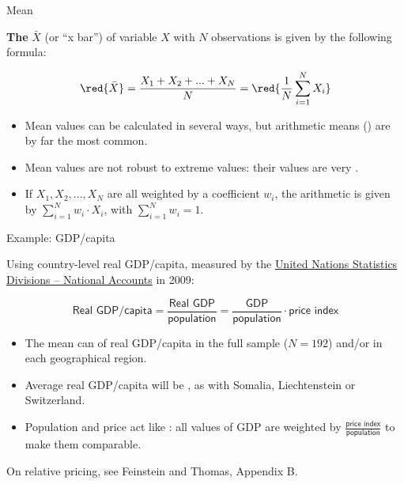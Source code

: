 \documentclass{beamer}
\begin{document}
	\begin{frame}[t]{Mean}

	\textbf{The } $\bar X$ (or ``x bar'') of variable $X$ with $N$ observations is given by the following formula:
	
	$$\red{\bar{X}} = \frac{\displaystyle X_1+X_2+...+X_N}{\displaystyle N} = \red{\frac{1}{N}\sum_{i=1}^N X_i}$$

	\begin{itemize}
		\item Mean values can be calculated in several ways, but arithmetic means () are by far the most common.
		
		\item Mean values are not robust to extreme values: their values are very .
				
		\item If $X_1, X_2,... , X_N$ are all weighted by a coefficient $w_i$, the arithmetic  is given by $\sum_{i=1}^N w_i \cdot X_i$, with $\sum_{i=1}^N w_i = 1$.
	\end{itemize}

	\end{frame}
	
	\begin{frame}[t]{Example: GDP/capita}

	Using country-level real GDP/capita, measured by the \href{http://unstats.un.org/unsd/snaama/}{United Nations Statistics Divisions -- National Accounts} in 2009:
	
	$$\textsf{Real GDP/capita} = \frac{\textsf{Real GDP}}{\textsf{population}} = \frac{\textsf{GDP}}{\textsf{population}} \cdot \textsf{price index}$$

	\begin{itemize}
		\item The mean can  of real GDP/capita in the full sample ($N = 192$) and/or in each geographical region.
		
		\item Average real GDP/capita will be , as with Somalia, Liechtenstein or Switzerland.
				
		\item Population and price act like : all values of GDP are weighted by $\frac{\textsf{price index}}{\textsf{population}}$ to make them comparable.
	\end{itemize}

		On relative pricing, see Feinstein and Thomas, Appendix B.
	\end{frame}
\end{document}
